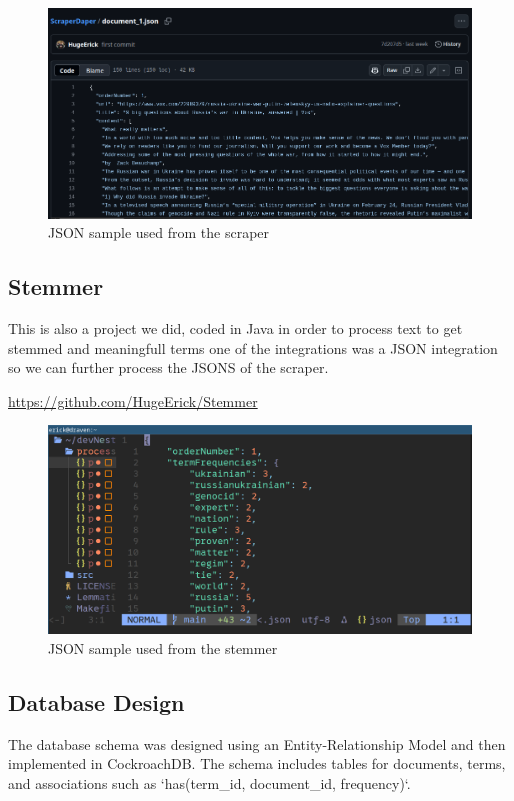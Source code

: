 \documentclass[twoside]{article}
\begin{document}
\begin{figure}[H]
  \centering
  \includegraphics[width=1\textwidth]{imgs/scraper.png}
  \caption{JSON sample used from the scraper}
  \label{fig:1}
\end{figure}

\subsection{Stemmer}
This is also a project we did, coded in Java in order to process text to get stemmed and meaningfull terms one of the integrations was a JSON integration so we can further process the JSONS of the scraper. 

\url{https://github.com/HugeErick/Stemmer}

\begin{figure}[H]
  \centering
  \includegraphics[width=1\textwidth]{imgs/stemmer.png}
  \caption{JSON sample used from the stemmer}
  \label{fig:2}
\end{figure}

\subsection{Database Design}
The database schema was designed using an Entity-Relationship Model and then implemented in CockroachDB. The schema includes tables for documents, terms, and associations such as `has(term\_id, document\_id, frequency)`.
\end{document}
